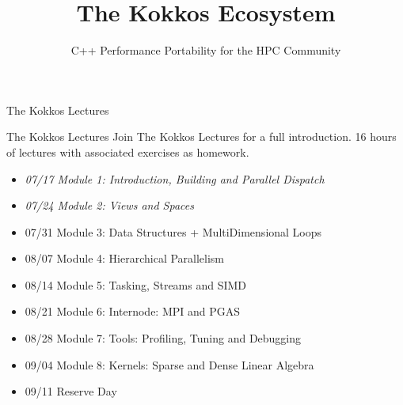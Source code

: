 
\usepackage{tikz}
\def\sandid{SAND2020-7755 PE}

\title{The Kokkos Ecosystem}

\author{C++ Performance Portability for the HPC Community}




\shorttrue
\mediumfalse
\fullfalse



% 

\begin{frame}
	\titlepage
\end{frame}



\begin{frame}{The Kokkos Lectures}
        
	\begin{block}{The Kokkos Lectures}
		Join The Kokkos Lectures for a full introduction. 16 hours of lectures with associated exercises as homework.
	\end{block}

\begin{itemize}
	\item \textit{07/17 Module 1: Introduction, Building and Parallel Dispatch}
	\item \textit{07/24 Module 2: Views and Spaces}
	\item 07/31 Module 3: Data Structures + MultiDimensional Loops
	\item 08/07 Module 4: Hierarchical Parallelism
	\item 08/14 Module 5: Tasking, Streams and SIMD
	\item 08/21 Module 6: Internode: MPI and PGAS
	\item 08/28 Module 7: Tools: Profiling, Tuning and Debugging
	\item 09/04 Module 8: Kernels: Sparse and Dense Linear Algebra
        \item 09/11 Reserve Day
\end{itemize}
\end{frame}


